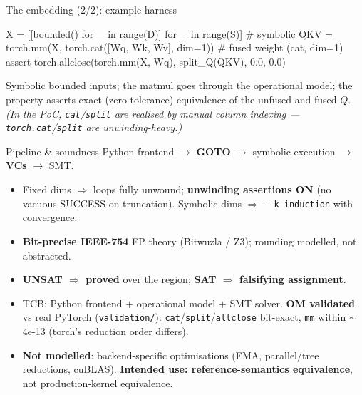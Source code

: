 \documentclass[aspectratio=169,11pt]{beamer}
\begin{document}
\begin{frame}[fragile]{The embedding (2/2): example harness}
  \begin{semiverbatim}\small
X   = [[bounded() for _ in range(D)] for _ in range(S)]    \# symbolic
QKV = torch.mm(X, torch.cat([Wq, Wk, Wv], dim=1))         \# fused weight (cat, dim=1)
assert torch.allclose(torch.mm(X, Wq), split_Q(QKV), 0.0, 0.0)
  \end{semiverbatim}

  \medskip
  Symbolic bounded inputs; the matmul goes through the operational model; the property
  asserts exact (zero-tolerance) equivalence of the unfused and fused $Q$. \emph{(In the PoC,
  \texttt{cat}/\texttt{split} are realised by manual column indexing --- \texttt{torch.cat}/\texttt{split}
  are unwinding-heavy.)}
\end{frame}

\begin{frame}{Pipeline \& soundness}
  Python frontend $\to$ \textbf{GOTO} $\to$ symbolic execution $\to$ \textbf{VCs} $\to$ SMT.
  \begin{itemize}
    \item Fixed dims $\Rightarrow$ loops fully unwound; \textbf{unwinding assertions ON} (no vacuous
      SUCCESS on truncation). Symbolic dims $\Rightarrow$ \texttt{-{}-k-induction} with convergence.
    \item \textbf{Bit-precise IEEE-754} FP theory (Bitwuzla / Z3); rounding modelled, not abstracted.
    \item \textbf{UNSAT $\Rightarrow$ proved} over the region; \textbf{SAT $\Rightarrow$ falsifying assignment}.
    \item TCB: Python frontend $+$ operational model $+$ SMT solver. \textbf{OM validated} vs real
      PyTorch (\texttt{validation/}): \texttt{cat}/\texttt{split}/\texttt{allclose} bit-exact,
      \texttt{mm} within $\sim$4e-13 (torch's reduction order differs).
    \item \textbf{Not modelled}: backend-specific optimisations (FMA, parallel/tree reductions,
      cuBLAS). \textbf{Intended use: reference-semantics equivalence}, not production-kernel equivalence.
  \end{itemize}
\end{frame}
\end{document}
